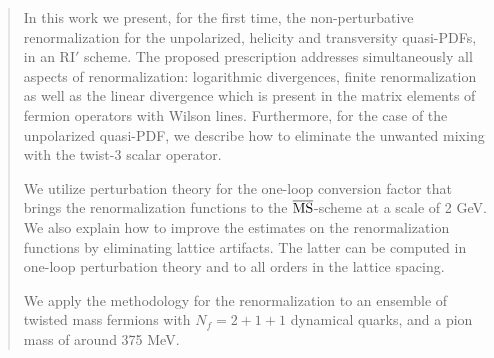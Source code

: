 \documentclass[11pt]{article}
\newcommand{\MSb}{{\overline{\rm MS}}}
\begin{document}
\begin{abstract}
In this work we present, for the first time, the non-perturbative renormalization for the unpolarized,
helicity and transversity quasi-PDFs, in an RI$'$ scheme. The proposed prescription addresses
simultaneously all aspects of renormalization: logarithmic divergences, finite renormalization as well as
the linear divergence which is present in the matrix elements of fermion operators with Wilson lines.
Furthermore, for the case of the unpolarized quasi-PDF, we describe how to eliminate the unwanted
mixing with the twist-3 scalar operator.

We utilize perturbation theory for the one-loop conversion factor that brings the renormalization functions
to the $\MSb$-scheme at a scale of 2 GeV. We also explain how to improve the estimates on the
renormalization functions by eliminating lattice artifacts. The latter can be computed in one-loop perturbation
theory and to all orders in the lattice spacing.

We apply the methodology for the renormalization to an ensemble of twisted mass fermions with $N_f{=}2{+}1{+}1$
dynamical quarks, and a pion mass of around 375 MeV.
\end{abstract}






\end{document}
